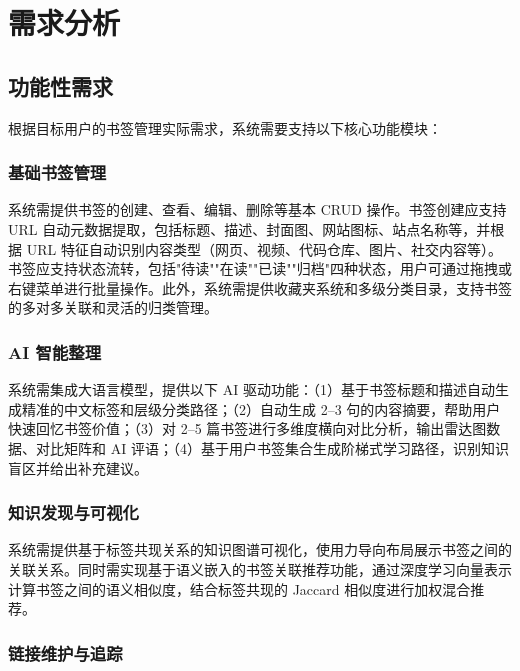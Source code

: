 \documentclass[12pt,a4paper]{ctexart}
\begin{document}
\section{需求分析}
\label{sec:requirements}

\subsection{功能性需求}

根据目标用户的书签管理实际需求，系统需要支持以下核心功能模块：

\subsubsection{基础书签管理}

系统需提供书签的创建、查看、编辑、删除等基本 CRUD 操作。书签创建应支持 URL 自动元数据提取，包括标题、描述、封面图、网站图标、站点名称等，并根据 URL 特征自动识别内容类型（网页、视频、代码仓库、图片、社交内容等）。书签应支持状态流转，包括"待读""在读""已读""归档"四种状态，用户可通过拖拽或右键菜单进行批量操作。此外，系统需提供收藏夹系统和多级分类目录，支持书签的多对多关联和灵活的归类管理。

\subsubsection{AI 智能整理}

系统需集成大语言模型，提供以下 AI 驱动功能：（1）基于书签标题和描述自动生成精准的中文标签和层级分类路径；（2）自动生成 2--3 句的内容摘要，帮助用户快速回忆书签价值；（3）对 2--5 篇书签进行多维度横向对比分析，输出雷达图数据、对比矩阵和 AI 评语；（4）基于用户书签集合生成阶梯式学习路径，识别知识盲区并给出补充建议。

\subsubsection{知识发现与可视化}

系统需提供基于标签共现关系的知识图谱可视化，使用力导向布局展示书签之间的关联关系。同时需实现基于语义嵌入的书签关联推荐功能，通过深度学习向量表示计算书签之间的语义相似度，结合标签共现的 Jaccard 相似度进行加权混合推荐。

\subsubsection{链接维护与追踪}
\end{document}
